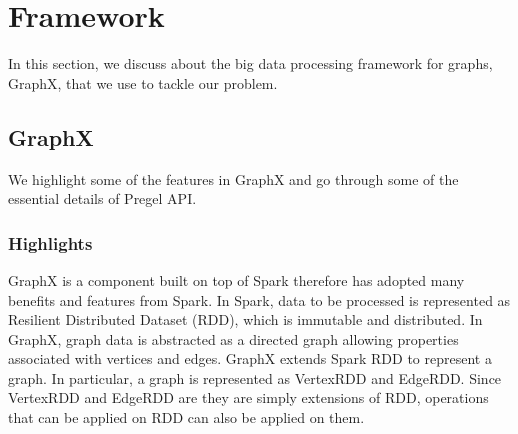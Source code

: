 \section{Framework}
%
In this section, we discuss about the big data processing framework for graphs, GraphX, that we use to tackle our problem.
%
\subsection{GraphX}
%
We highlight some of the features in GraphX and go through some of the essential details of Pregel API.
%
\subsubsection{Highlights}
%
GraphX is a component built on top of Spark therefore has adopted many benefits and features from Spark.
%
In Spark, data to be processed is represented as Resilient Distributed Dataset (RDD), which is immutable and distributed.
%
In GraphX, graph data is abstracted as a directed graph allowing properties associated with vertices and edges.
%
GraphX extends Spark RDD to represent a graph.
%
In particular, a graph is represented as VertexRDD and EdgeRDD.
%
Since VertexRDD and EdgeRDD are they are simply extensions of RDD, operations that can be applied on RDD can also be applied on them.
%
